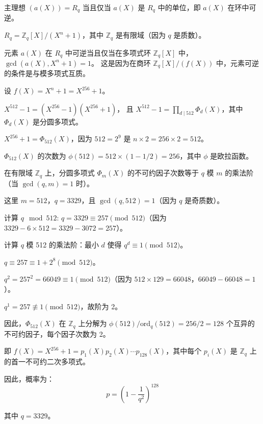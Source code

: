 \documentclass[12pt,a4paper]{article}
\numberwithin{equation}{section}
\begin{document}
主理想 $(a(X)) = R_q$ 当且仅当 $a(X)$ 是 $R_q$ 中的单位，即 $a(X)$ 在环中可逆。

$R_q = \mathbb{Z}_q[X]/(X^n + 1)$，其中 $\mathbb{Z}_q$ 是有限域（因为 $q$ 是质数）。

元素 $a(X)$ 在 $R_q$ 中可逆当且仅当在多项式环 $\mathbb{Z}_q[X]$ 中，$\gcd(a(X), X^n + 1) = 1$。
这是因为在商环 $\mathbb{Z}_q[X]/(f(X))$ 中，元素可逆的条件是与模多项式互质。

设 $f(X) = X^n + 1 = X^{256} + 1$。

$X^{512} - 1 = (X^{256} - 1)(X^{256} + 1)$，
且 $X^{512} - 1 = \prod_{d \mid 512} \Phi_d(X)$，其中 $\Phi_d(X)$ 是分圆多项式。

$X^{256} + 1 = \Phi_{512}(X)$，因为 $512 = 2^9$ 是 $n \times 2 = 256 \times 2 = 512$。

$\Phi_{512}(X)$ 的次数为 $\phi(512) = 512 \times (1 - 1/2) = 256$，其中 $\phi$ 是欧拉函数。

在有限域 $\mathbb{Z}_q$ 上，分圆多项式 $\Phi_m(X)$ 的不可约因子次数等于 $q$ 模 $m$ 的乘法阶（当 $\gcd(q, m) = 1$ 时）。

这里 $m = 512$，$q = 3329$，且 $\gcd(q, 512) = 1$（因为 $q$ 是奇质数）。

计算 $q \mod 512$: $q = 3329 \equiv 257 \pmod{512}$（因为 $3329 - 6 \times 512 = 3329 - 3072 = 257$）。

计算 $q$ 模 512 的乘法阶：最小 $d$ 使得 $q^d \equiv 1 \pmod{512}$。

$q \equiv 257 \equiv 1 + 2^8 \pmod{512}$。

$q^2 = 257^2 = 66049 \equiv 1 \pmod{512}$（因为 $512 \times 129 = 66048$，$66049 - 66048 = 1$）。

$q^1 = 257 \not\equiv 1 \pmod{512}$，故阶为 2。

因此，$\Phi_{512}(X)$ 在 $\mathbb{Z}_q$ 上分解为 $\phi(512) / \text{ord}_q(512) = 256 / 2 = 128$ 个互异的不可约因子，每个因子次数为 2。

即 $f(X) = X^{256} + 1 = p_1(X) p_2(X) \cdots p_{128}(X)$，其中每个 $p_i(X)$ 是 $\mathbb{Z}_q$ 上的首一不可约二次多项式。

因此，概率为：
\begin{equation}
p = \left(1 - \frac{1}{q^2}\right)^{128} 
\end{equation}

其中 $q = 3329$。

\end{document}
